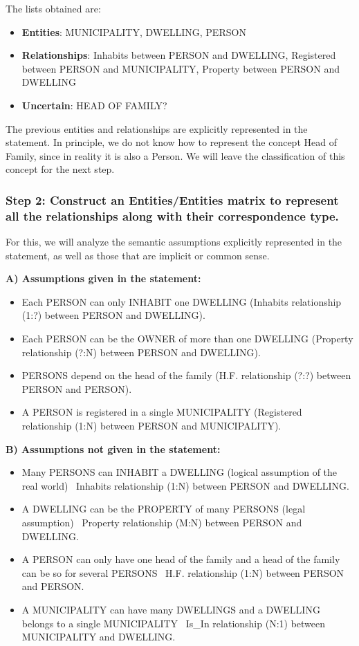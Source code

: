 \documentclass{article}
\begin{document}
The lists obtained are:

\begin{itemize}
    \item \textbf{Entities}: MUNICIPALITY, DWELLING, PERSON
    \item \textbf{Relationships}: Inhabits between PERSON and DWELLING, Registered between PERSON and MUNICIPALITY, Property between PERSON and DWELLING
    \item \textbf{Uncertain}: HEAD OF FAMILY?
\end{itemize}

The previous entities and relationships are explicitly represented in the statement.  In principle, we do not know how to represent the concept Head of Family, since in reality it is also a Person.  We will leave the classification of this concept for the next step.

\subsubsection*{Step 2: Construct an Entities/Entities matrix to represent all the relationships along with their correspondence type.}

For this, we will analyze the semantic assumptions explicitly represented in the statement, as well as those that are implicit or common sense.

\textbf{A) Assumptions given in the statement:}

\begin{itemize}
    \item Each PERSON can only INHABIT one DWELLING (Inhabits relationship (1:?) between PERSON and DWELLING).
    \item Each PERSON can be the OWNER of more than one DWELLING (Property relationship (?:N) between PERSON and DWELLING).
    \item PERSONS depend on the head of the family (H.F. relationship (?:?) between PERSON and PERSON).
    \item A PERSON is registered in a single MUNICIPALITY (Registered relationship (1:N) between PERSON and MUNICIPALITY).
\end{itemize}

\textbf{B) Assumptions not given in the statement:}

\begin{itemize}
    \item Many PERSONS can INHABIT a DWELLING (logical assumption of the real world) \textrightarrow ~Inhabits relationship (1:N) between PERSON and DWELLING.
    \item A DWELLING can be the PROPERTY of many PERSONS (legal assumption) \textrightarrow ~Property relationship (M:N) between PERSON and DWELLING.
    \item A PERSON can only have one head of the family and a head of the family can be so for several PERSONS \textrightarrow ~H.F. relationship (1:N) between PERSON and PERSON.
    \item A MUNICIPALITY can have many DWELLINGS and a DWELLING belongs to a single MUNICIPALITY \textrightarrow ~Is\_In relationship (N:1) between MUNICIPALITY and DWELLING.
\end{itemize}
\end{document}
